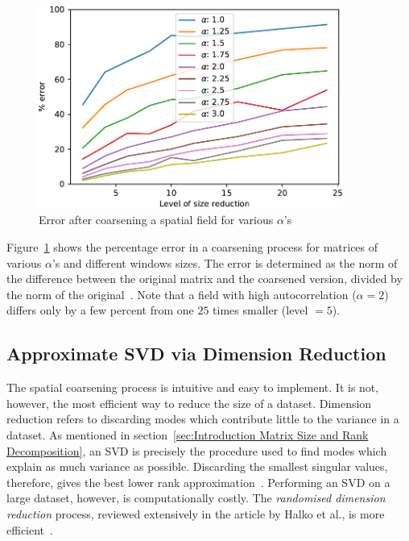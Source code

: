 \documentclass[ijgi,article,submit,moreauthors,pdftex,10pt,a4paper]{Definitions/mdpi}
\begin{document}
\begin{figure}[H]
\centering
\includegraphics[width=100mm]{Results/plotSingleSpatialFieldViaCoarsening.pdf}
\caption[Error after coarsening a spatial field]{Error after coarsening a spatial field for various $\alpha$'s}
\label{fig:plotSingleSpatialFieldViaCoarsening}
\end{figure}

Figure~\ref{fig:plotSingleSpatialFieldViaCoarsening} shows the percentage error in a coarsening process for matrices of various $\alpha$'s and different windows sizes. The error is determined as the norm of the difference between the original matrix and the coarsened version, divided by the norm of the original~\cite{Bogaardt2018}. Note that a field with high autocorrelation ($\alpha=2$) differs only by a few percent from one $25$ times smaller (level $= 5$).

\subsection{Approximate SVD via Dimension Reduction}
\label{sec:Materials and Methods/Approximate SVD via Dimension Reduction}

The spatial coarsening process is intuitive and easy to implement. It is not, however, the most efficient way to reduce the size of a dataset. Dimension reduction refers to discarding modes which contribute little to the variance in a dataset. As mentioned in section~\ref{sec:Introduction Matrix Size and Rank Decomposition}, an SVD is precisely the procedure used to find modes which explain as much variance as possible. Discarding the smallest singular values, therefore, gives the best lower rank approximation~\cite{Eckart1936, Martinsson2016}. Performing an SVD on a large dataset, however, is computationally costly. The \textit{randomised dimension reduction} process, reviewed extensively in the article by Halko et al., is more efficient~\cite{Halko2011, Li2016}.
\end{document}
